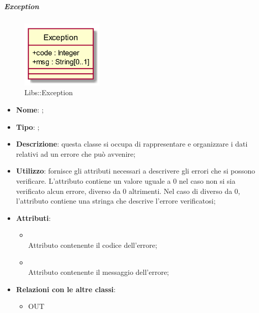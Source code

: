 \hypertarget{Exception_label}{\subparagraph{Exception}}
\begin{figure}[h]
	\centering
	\includegraphics[width=0.35\textwidth,height=\textheight,keepaspectratio]{images/ClassException.png}
	\caption{Libs::Exception}
\end{figure}
\begin{itemize}
	\item \textbf{Nome}: ;
	\item \textbf{Tipo}: ;
	\item \textbf{Descrizione}: questa classe si occupa di rappresentare e organizzare i dati relativi ad un errore che può avvenire;
	\item \textbf{Utilizzo}: fornisce gli attributi necessari a descrivere gli errori che si possono verificare.
L'attributo  contiene un valore uguale a 0 nel caso non si sia verificato alcun errore, diverso da 0 altrimenti.
Nel caso di  diverso da 0, l'attributo  contiene una stringa che descrive l'errore verificatosi;
	\item \textbf{Attributi}:
	\begin{itemize}
		\item[]  \\
		Attributo contenente il codice dell'errore;
		\item[]  \\
		Attributo contenente il messaggio dell'errore;
	\end{itemize}
	\item \textbf{Relazioni con le altre classi}:
	\begin{itemize}
		\item OUT \hyperlink{ErrorSubject_label}{}
	\end{itemize}
\end{itemize}
\FloatBarrier

